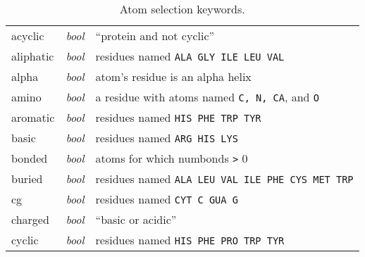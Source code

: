 \begin{table}[htb]
\begin{tabular}{|p{.9 in}| p{.4 in}| p{4.5in}| }
acyclic       & {\it bool}  & ``protein and not cyclic'' \\
aliphatic     & {\it bool}  & residues named  {\tt ALA GLY ILE LEU VAL} \\
alpha         & {\it bool}  & atom's residue is an alpha helix \\
amino         & {\it bool}  & a residue with atoms named {\tt C, N, CA}, and {\tt O} \\
aromatic      & {\it bool}  & residues named {\tt HIS PHE TRP TYR} \\
basic         & {\it bool}  & residues named {\tt ARG HIS LYS} \\
bonded        & {\it bool}  & atoms for which numbonds {\tt >} 0 \\
buried        & {\it bool}  & residues named {\tt ALA LEU VAL ILE PHE CYS MET TRP} \\
cg            & {\it bool}  & residues named {\tt CYT C GUA G} \\
charged       & {\it bool}  & ``basic or acidic'' \\
cyclic        & {\it bool}  & residues named {\tt HIS PHE PRO TRP TYR} \\
\hline
\end{tabular}
\caption{Atom selection keywords.}
\label{table:ug:keywords}
\end{table}

